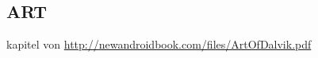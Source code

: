 \subsection{ART} \label{subsection:android-art}
kapitel von \url{http://newandroidbook.com/files/ArtOfDalvik.pdf}
